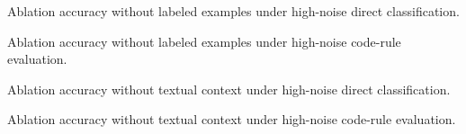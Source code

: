 \begin{table}[!htbp]
\centering
\caption{Ablation accuracy without labeled examples under high-noise direct classification.}
\label{tab:app-calibration-frost-01234-pine}

\end{table}

\begin{table}[!htbp]
\centering
\caption{Ablation accuracy without labeled examples under high-noise code-rule evaluation.}
\label{tab:app-calibration-frost-01234-orbit}

\end{table}

\begin{table}[!htbp]
\centering
\caption{Ablation accuracy without textual context under high-noise direct classification.}
\label{tab:app-calibration-gentle-01234-harbor}

\end{table}

\begin{table}[!htbp]
\centering
\caption{Ablation accuracy without textual context under high-noise code-rule evaluation.}
\label{tab:app-calibration-gentle-01234-tide}

\end{table}
